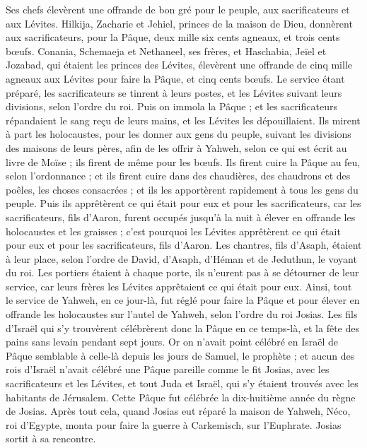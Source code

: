 \begin{multicols}{2}
Ses chefs élevèrent une offrande de bon gré pour le peuple, aux sacrificateurs et aux Lévites. Hilkija, Zacharie et Jehiel, princes de la maison de Dieu, donnèrent aux sacrificateurs, pour la Pâque, deux mille six cents agneaux, et trois cents bœufs.
Conania, Schemaeja et Nethaneel, ses frères, et Haschabia, Jeïel et Jozabad, qui étaient les princes des Lévites, élevèrent une offrande de cinq mille  agneaux aux Lévites pour faire la Pâque, et cinq cents bœufs.
Le service étant préparé, les sacrificateurs se tinrent à leurs postes, et les Lévites suivant leurs divisions, selon l’ordre du roi.
Puis on immola la Pâque ; et les sacrificateurs répandaient le sang reçu de leurs mains, et les Lévites les dépouillaient.
Ils mirent à part les holocaustes, pour les donner aux gens du peuple, suivant les divisions des maisons de leurs pères, afin de les offrir à Yahweh, selon ce qui est écrit au livre de Moïse ; ils firent de même pour les bœufs.
Ils firent cuire la Pâque au feu, selon l'ordonnance ; et ils firent cuire dans des chaudières, des chaudrons et des poêles, les choses consacrées ; et ils les apportèrent rapidement à tous les gens du peuple.
Puis ils apprêtèrent ce qui était pour eux et pour les sacrificateurs, car les sacrificateurs, fils d'Aaron, furent occupés jusqu'à la nuit à élever en offrande les holocaustes et les graisses ; c'est pourquoi les Lévites apprêtèrent ce qui était pour eux et pour les sacrificateurs, fils d'Aaron.
Les chantres, fils d'Asaph, étaient à leur place, selon l'ordre de David, d'Asaph, d'Héman et de Jeduthun, le voyant du roi. Les portiers étaient à chaque porte, ils n'eurent pas à se détourner de leur service, car leurs frères les Lévites apprêtaient ce qui était pour eux.
Ainsi, tout le service de Yahweh, en ce jour-là, fut réglé pour faire la Pâque et pour élever en offrande les holocaustes sur l'autel de Yahweh, selon l’ordre du roi Josias.
Les fils d’Israël qui s'y trouvèrent célébrèrent donc la Pâque en ce temps-là, et la fête des pains sans levain pendant sept jours.
Or on n'avait point célébré en Israël de Pâque semblable à celle-là depuis les jours de Samuel, le prophète ; et aucun des rois d'Israël n'avait célébré une Pâque pareille comme le fit Josias, avec les sacrificateurs et les Lévites, et tout Juda et Israël, qui s'y étaient trouvés avec les habitants de Jérusalem.
Cette Pâque fut célébrée la dix-huitième année du règne de Josias.
Après tout cela, quand Josias eut réparé la maison de Yahweh, Néco, roi d'Egypte, monta pour faire la guerre à Carkemisch, sur l'Euphrate. Josias sortit à sa rencontre.

\end{multicols}
